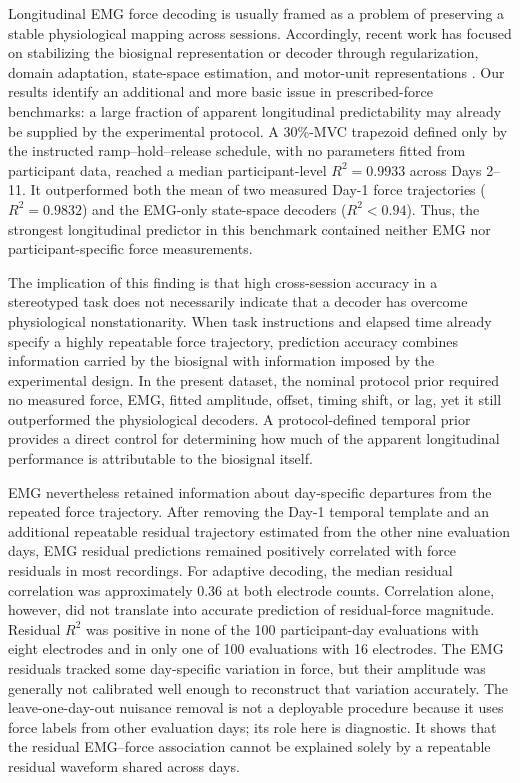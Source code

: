 \documentclass[preprint,12pt]{elsarticle}
\begin{document}
Longitudinal EMG force decoding is usually framed as a problem of preserving a stable physiological mapping across sessions. Accordingly, recent work has focused on stabilizing the biosignal representation or decoder through regularization, domain adaptation, state-space estimation, and motor-unit representations \cite{Jiang2022,Wang2024,Li2024,Pan2025,Dutra2021,Ruan2025,Roy2026,MengHu2026}. Our results identify an additional and more basic issue in prescribed-force benchmarks: a large fraction of apparent longitudinal predictability may already be supplied by the experimental protocol. A 30\%-MVC trapezoid defined only by the instructed ramp--hold--release schedule, with no parameters fitted from participant data, reached a median participant-level $R^2=0.9933$ across Days 2--11. It outperformed both the mean of two measured Day-1 force trajectories ($R^2=0.9832$) and the EMG-only state-space decoders ($R^2<0.94$). Thus, the strongest longitudinal predictor in this benchmark contained neither EMG nor participant-specific force measurements.

The implication of this finding is that high cross-session accuracy in a stereotyped task does not necessarily indicate that a decoder has overcome physiological nonstationarity. When task instructions and elapsed time already specify a highly repeatable force trajectory, prediction accuracy combines information carried by the biosignal with information imposed by the experimental design. In the present dataset, the nominal protocol prior required no measured force, EMG, fitted amplitude, offset, timing shift, or lag, yet it still outperformed the physiological decoders. A protocol-defined temporal prior provides a direct control for determining how much of the apparent longitudinal performance is attributable to the biosignal itself.

EMG nevertheless retained information about day-specific departures from the repeated force trajectory. After removing the Day-1 temporal template and an additional repeatable residual trajectory estimated from the other nine evaluation days, EMG residual predictions remained positively correlated with force residuals in most recordings. For adaptive decoding, the median residual correlation was approximately 0.36 at both electrode counts. Correlation alone, however, did not translate into accurate prediction of residual-force magnitude. Residual $R^2$ was positive in none of the 100 participant-day evaluations with eight electrodes and in only one of 100 evaluations with 16 electrodes. The EMG residuals tracked some day-specific variation in force, but their amplitude was generally not calibrated well enough to reconstruct that variation accurately. The leave-one-day-out nuisance removal is not a deployable procedure because it uses force labels from other evaluation days; its role here is diagnostic. It shows that the residual EMG--force association cannot be explained solely by a repeatable residual waveform shared across days.
\end{document}
